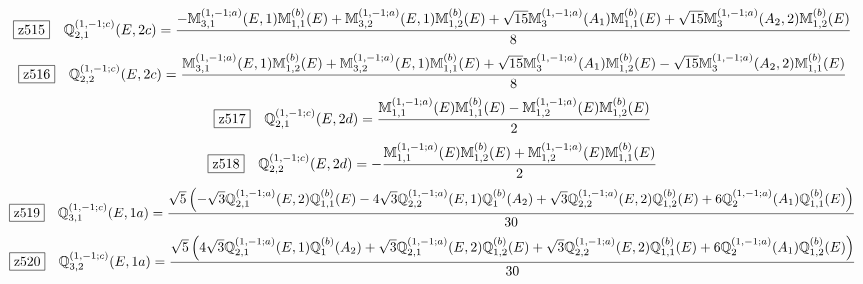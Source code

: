\documentclass[fleqn,10pt,landscape]{jsarticle}
\begin{document}
\begin{dmath*}
\hspace*{3mm}\fbox{z515}\quad \mathbb{Q}_{2,1}^{(1,-1;c)}(E,2c)=\frac{- \mathbb{M}_{3,1}^{(1,-1;a)}(E,1) \mathbb{M}_{1,1}^{(b)}(E) + \mathbb{M}_{3,2}^{(1,-1;a)}(E,1) \mathbb{M}_{1,2}^{(b)}(E) + \sqrt{15} \mathbb{M}_{3}^{(1,-1;a)}(A_{1}) \mathbb{M}_{1,1}^{(b)}(E) + \sqrt{15} \mathbb{M}_{3}^{(1,-1;a)}(A_{2},2) \mathbb{M}_{1,2}^{(b)}(E)}{8}
\end{dmath*}
\begin{dmath*}
\hspace*{3mm}\fbox{z516}\quad \mathbb{Q}_{2,2}^{(1,-1;c)}(E,2c)=\frac{\mathbb{M}_{3,1}^{(1,-1;a)}(E,1) \mathbb{M}_{1,2}^{(b)}(E) + \mathbb{M}_{3,2}^{(1,-1;a)}(E,1) \mathbb{M}_{1,1}^{(b)}(E) + \sqrt{15} \mathbb{M}_{3}^{(1,-1;a)}(A_{1}) \mathbb{M}_{1,2}^{(b)}(E) - \sqrt{15} \mathbb{M}_{3}^{(1,-1;a)}(A_{2},2) \mathbb{M}_{1,1}^{(b)}(E)}{8}
\end{dmath*}
\begin{dmath*}
\hspace*{3mm}\fbox{z517}\quad \mathbb{Q}_{2,1}^{(1,-1;c)}(E,2d)=\frac{\mathbb{M}_{1,1}^{(1,-1;a)}(E) \mathbb{M}_{1,1}^{(b)}(E) - \mathbb{M}_{1,2}^{(1,-1;a)}(E) \mathbb{M}_{1,2}^{(b)}(E)}{2}
\end{dmath*}
\begin{dmath*}
\hspace*{3mm}\fbox{z518}\quad \mathbb{Q}_{2,2}^{(1,-1;c)}(E,2d)=- \frac{\mathbb{M}_{1,1}^{(1,-1;a)}(E) \mathbb{M}_{1,2}^{(b)}(E) + \mathbb{M}_{1,2}^{(1,-1;a)}(E) \mathbb{M}_{1,1}^{(b)}(E)}{2}
\end{dmath*}
\begin{dmath*}
\hspace*{3mm}\fbox{z519}\quad \mathbb{Q}_{3,1}^{(1,-1;c)}(E,1a)=\frac{\sqrt{5} \left(- \sqrt{3} \mathbb{Q}_{2,1}^{(1,-1;a)}(E,2) \mathbb{Q}_{1,1}^{(b)}(E) - 4 \sqrt{3} \mathbb{Q}_{2,2}^{(1,-1;a)}(E,1) \mathbb{Q}_{1}^{(b)}(A_{2}) + \sqrt{3} \mathbb{Q}_{2,2}^{(1,-1;a)}(E,2) \mathbb{Q}_{1,2}^{(b)}(E) + 6 \mathbb{Q}_{2}^{(1,-1;a)}(A_{1}) \mathbb{Q}_{1,1}^{(b)}(E)\right)}{30}
\end{dmath*}
\begin{dmath*}
\hspace*{3mm}\fbox{z520}\quad \mathbb{Q}_{3,2}^{(1,-1;c)}(E,1a)=\frac{\sqrt{5} \left(4 \sqrt{3} \mathbb{Q}_{2,1}^{(1,-1;a)}(E,1) \mathbb{Q}_{1}^{(b)}(A_{2}) + \sqrt{3} \mathbb{Q}_{2,1}^{(1,-1;a)}(E,2) \mathbb{Q}_{1,2}^{(b)}(E) + \sqrt{3} \mathbb{Q}_{2,2}^{(1,-1;a)}(E,2) \mathbb{Q}_{1,1}^{(b)}(E) + 6 \mathbb{Q}_{2}^{(1,-1;a)}(A_{1}) \mathbb{Q}_{1,2}^{(b)}(E)\right)}{30}
\end{dmath*}
\end{document}
